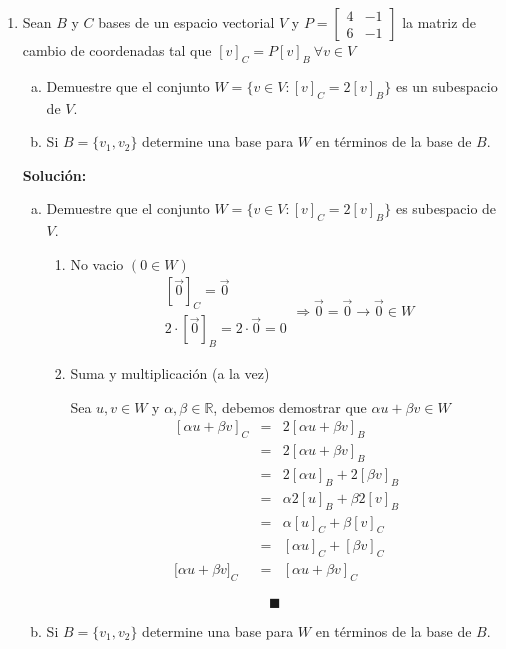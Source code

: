 \documentclass[12pt]{article}
\newenvironment{solucion}
{\begin{mdframed}[backgroundcolor=black!10]
		{\bf Solución:}\\
	}
	{
	\end{mdframed}
}
\newenvironment{preguntas}
{\begin{enumerate}\itemsep12pt
	}
	{
	\end{enumerate}
}
\newcommand{\ra}{\rightarrow}
\newcommand{\R}{\mathbb{R}}
\begin{document}
\begin{preguntas}
\begin{solucion}
		Luego,
		$$q_1(x) = 2(1+x) - 2(1-x) + (1+x^2) = 1+4x+x^2$$
		$$q_2(x) = -(1+x) + 2(1-x) - (1+x^2) = -3x-x^2$$
		$$q_3(x) = (1+x) - (1-x) + (1+x^2) = 1+2x+x^2$$
		Finalmente,
		$$B_2 = \{1+4x+x^2,-3x-x^2,1+2x+x^2\}$$
\end{solucion}
\item Sean $B$ y $C$ bases de un espacio vectorial $V$ y $P = \begin{bmatrix}4 &-1 \\ 6 & -1\end{bmatrix}$ la matriz de cambio de coordenadas tal que $[v]_C = P[v]_B\ \forall v \in V$
\begin{enumerate}[a)]
\item Demuestre que el conjunto $W = \{v \in V: [v]_C = 2[v]_B\}$ es un subespacio de $V$.
\item Si $B=\{v_1,v_2\}$ determine una base para $W$ en términos de la base de $B$.
\end{enumerate}
\begin{solucion}

\begin{enumerate}[a)]
\item Demuestre que el conjunto $W = \{v \in V: [v]_C = 2[v]_B\}$ es subespacio de $V$.
			
			\begin{enumerate}
				\item No vacio $(0\in W)$
				$$\begin{array}{cc}
				[\vec{0}]_C = \vec{0}\\
				2 \cdot [\vec{0}]_B = 2 \cdot \vec{0} = 0
				\end{array} \Longrightarrow \vec{0} = \vec{0} \ra \vec{0} \in W$$	
				\item Suma y multiplicación (a la vez)	
				
				
				Sea $u, v \in W$ y $\alpha, \beta \in \R$, debemos demostrar que $\alpha u + \beta v \in W$
				$$\begin{array}{rcl}
				[\alpha u + \beta v]_C & = & 2 [\alpha u + \beta v]_B \\
				& = & 2 [\alpha u + \beta v]_B \\
				& = & 2 [\alpha u]_B + 2[\beta v]_B \\
				& = & \alpha 2[u]_B + \beta 2[v]_B \\
				& = & \alpha [u]_C + \beta [v]_C \\
				& = & [\alpha u]_C + [\beta v]_C \\
				{[}\alpha u + \beta v]_C & = & [\alpha u +\beta v]_C
				\end{array}
				$$
			\end{enumerate}
			$$\blacksquare$$
\item Si $B=\{v_1,v_2\}$ determine una base para $W$ en términos de la base de $B$.
			

\end{enumerate}
\end{solucion}
\end{preguntas}
\end{document}
